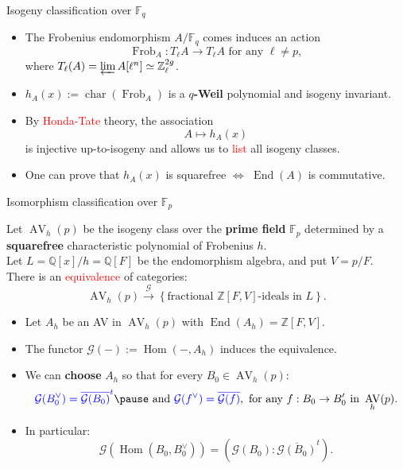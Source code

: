 \documentclass[usenames,dvipsnames,handout]{beamer}
\def\Q{\mathbb{Q}}
\def\Z{\mathbb{Z}}
\def\F{\mathbb{F}}
\DeclareMathOperator{\AV}{AV}
\DeclareMathOperator{\Char}{char}
\DeclareMathOperator{\Frob}{Frob}
\DeclareMathOperator{\Hom}{Hom}
\DeclareMathOperator{\End}{End}
\newcommand{\cG}{\mathcal{G}}
\newcommand{\set}[1]{\left\lbrace#1\right\rbrace }
\newcommand{\red}[1]{\textcolor{red}{#1}}
\newcommand{\blue}[1]{\textcolor{blue}{#1}}
\begin{document}
\begin{frame}{ Isogeny classification over $\F_q$}
	\begin{itemize}
    \item The {Frobenius endomorphism} $A/\F_{q}$ comes 
    \pause induces an action
		\[ \Frob_A : T_\ell A \rightarrow T_\ell A \text{ for any }\ell\neq p, \]
		where $T_\ell(A) = \varprojlim A[\ell^n] \simeq \Z_\ell^{2g}$.
	\pause \item ${h_A(x)}:=\Char(\Frob_A)$ is a {\bf $q$-Weil} polynomial and isogeny {invariant}.
	\pause \item By \red{Honda-Tate} theory, the association
		\[ A \longmapsto h_A(x) \]
		is injective up-to-isogeny and allows us to \red{list} all isogeny classes.
	\pause \item One can prove that $h_A(x)$ is squarefree $\iff$ $\End(A)$ is commutative.
	\end{itemize}
\end{frame}

\begin{frame}{ Isomorphism classification over $\F_p$ }
\pause 
    \begin{theorem}
    Let $\AV_h(p)$ be the isogeny class over the {\bf prime field} $\F_p$ determined by a {\bf squarefree} characteristic polynomial of Frobenius $h$.\\
    Let $L=\Q[x]/h=\Q[F]$ be the endomorphism algebra, and put $V=p/F$.\\
\pause 
    There is an \red{equivalence} of categories:
    \[ \AV_h(p) \overset{\cG}{\longrightarrow} \set{\text{fractional $\Z[F,V]$-ideals in $L$}}.  \]
    \end{theorem}
	\begin{itemize}
\pause 
    \item Let $A_h$ be an AV in $\AV_h(p)$ with $\End(A_h)=\Z[F,V]$.
\pause 
    \item The functor $\cG(-):=\Hom(-,A_h)$ induces the equivalence.
\pause 
    \item We can {\bf choose} $A_h$ so that for every $B_0\in \AV_h(p)$:
    \[ \blue{\cG(B_0^\vee) = \overline{\cG(B_0)}^t}
\pause    
     \text{ and } \blue{\cG(f^\vee) = \overline{\cG(f)}}, \text{ for any }f: B_0\to B_0' \text{ in }\AV_h(p). \]
\pause
    \vspace{-0.8cm}     
    \item In particular:
    \vspace{-0.5cm}    
    \[ \cG(\Hom(B_0,B_0^\vee)) = (\cG(B_0):\overline{\cG(B_0)}^t). \]
	\end{itemize}
\end{frame}
\end{document}
